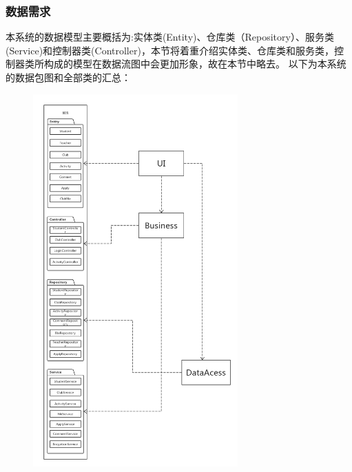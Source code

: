 \documentclass[UTF8]{ctexart}
\begin{document}
\subsubsection{数据需求}
本系统的数据模型主要概括为:实体类(Entity)、仓库类（Repository）、服务类(Service)和控制器类(Controller)，本节将着重介绍实体类、仓库类和服务类，控制器类所构成的模型在数据流图中会更加形象，故在本节中略去。
以下为本系统的数据包图和全部类的汇总：
\newline
\newline
\begin{figure}
\centering
\includegraphics[width = 0.7\textwidth]{package.png}
\end{figure}
\end{document}
